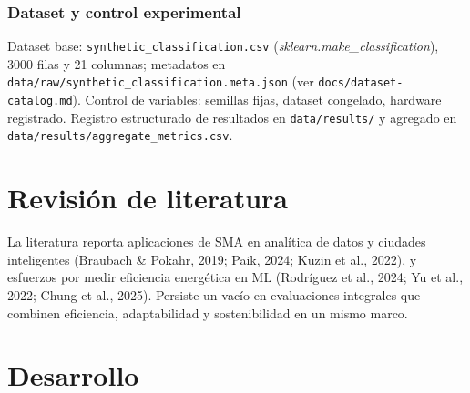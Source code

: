 \documentclass[12pt,oneside]{report}
\begin{document}
\subsection*{Dataset y control experimental}
Dataset base: \texttt{synthetic\_classification.csv} (\textit{sklearn.make\_classification}), 3000 filas y 21 columnas; metadatos en \texttt{data/raw/synthetic\_classification.meta.json} (ver \texttt{docs/dataset-catalog.md}). Control de variables: semillas fijas, dataset congelado, hardware registrado. Registro estructurado de resultados en \texttt{data/results/} y agregado en \texttt{data/results/aggregate\_metrics.csv}.

\chapter{Revisión de literatura}
La literatura reporta aplicaciones de SMA en analítica de datos y ciudades inteligentes (Braubach \& Pokahr, 2019; Paik, 2024; Kuzin et al., 2022), y esfuerzos por medir eficiencia energética en ML (Rodríguez et al., 2024; Yu et al., 2022; Chung et al., 2025). Persiste un vacío en evaluaciones integrales que combinen eficiencia, adaptabilidad y sostenibilidad en un mismo marco.

\chapter{Desarrollo}
\end{document}
